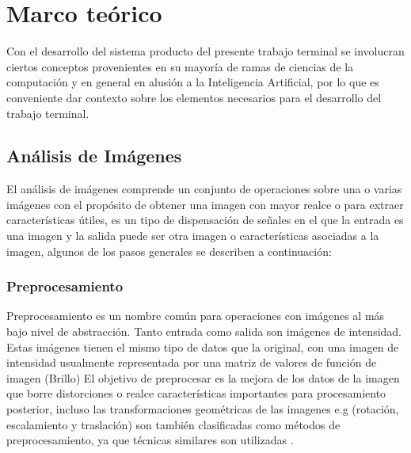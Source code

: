 \chapter{Marco teórico}
Con el desarrollo del sistema producto del presente trabajo terminal se involucran ciertos conceptos provenientes en su mayoría de ramas de ciencias de la computación y en general en alusión a la Inteligencia Artificial, por lo que es conveniente dar contexto sobre los elementos necesarios para el desarrollo del trabajo terminal.
\section{Análisis de Imágenes}\label{imAnalysis}
        El análisis de imágenes comprende un conjunto de operaciones sobre una o varias imágenes con el propósito de obtener una imagen con mayor realce o para extraer características útiles, es un tipo de dispensación de señales en el que la entrada es una imagen y la salida puede ser otra imagen o características asociadas a la imagen, algunos de los pasos generales se describen a continuación:
        
        \subsection{Preprocesamiento}
            Preprocesamiento es un nombre común para operaciones con imágenes al más bajo nivel de abstracción. Tanto entrada como salida son imágenes de intensidad. Estas imágenes tienen el mismo tipo de datos que la original, con una imagen de intensidad usualmente representada por una matriz de valores de función de imagen (Brillo) El objetivo de preprocesar es la mejora de los datos de la imagen que borre distorciones o realce características importantes para procesamiento posterior, incluso las transformaciones geométricas de las imagenes e.g (rotación, escalamiento y traslación) son también clasificadas como métodos de preprocesamiento, ya que técnicas similares son utilizadas \cite{imgAnalySeg}.
               
                
